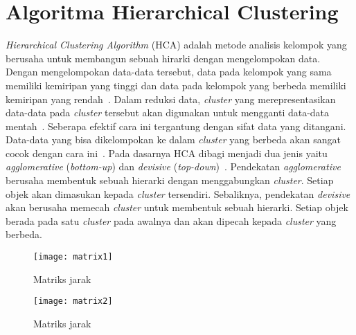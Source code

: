 \section{Algoritma Hierarchical Clustering}

\textit{Hierarchical Clustering Algorithm} (HCA) adalah metode analisis kelompok yang berusaha untuk membangun sebuah hirarki dengan mengelompokan data. Dengan mengelompokan data-data tersebut, data pada kelompok yang sama memiliki kemiripan yang tinggi dan data pada kelompok yang berbeda memiliki kemiripan yang rendah~\cite{veronica:02:bdhca}. Dalam reduksi data, \textit{cluster} yang merepresentasikan data-data pada \textit{cluster} tersebut akan digunakan untuk mengganti data-data mentah~\cite{veronica:02:bdhca}. Seberapa efektif cara ini tergantung dengan sifat data yang ditangani. Data-data yang bisa dikelompokan ke dalam \textit{cluster} yang berbeda akan sangat cocok dengan cara ini~\cite{veronica:02:bdhca}. Pada dasarnya HCA dibagi menjadi dua jenis yaitu \textit{agglomerative} (\textit{bottom-up}) dan \textit{devisive} (\textit{top-down})~\cite{veronica:02:bdhca}. Pendekatan \textit{agglomerative} berusaha membentuk sebuah hierarki dengan menggabungkan \textit{cluster}. Setiap objek akan dimasukan kepada \textit{cluster} tersendiri. Sebaliknya, pendekatan \textit{devisive} akan berusaha memecah \textit{cluster} untuk membentuk sebuah hierarki. Setiap objek berada pada satu \textit{cluster} pada awalnya dan akan dipecah kepada \textit{cluster} yang berbeda.\\

\begin{figure}[H]
    \centering  
    \texttt{[image: matrix1]}  
    \caption[Matriks jarak]{Matriks jarak} 
    \label{fig:matrix1} 
\end{figure}

\begin{figure}[H]
    \centering  
    \texttt{[image: matrix2]}  
    \caption[Matriks jarak]{Matriks jarak} 
    \label{fig:matrix2} 
\end{figure}

